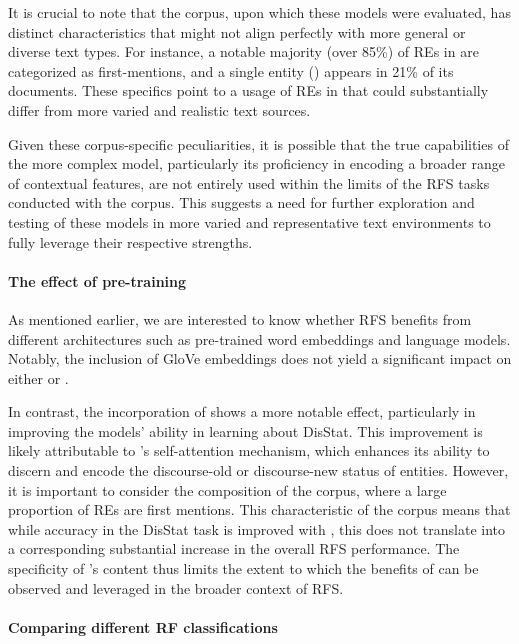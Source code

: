 It is crucial to note that the \webnlg corpus, upon which these models were evaluated, has distinct characteristics that might not align perfectly with more general or diverse text types. For instance, a notable majority (over 85\%) of REs in \webnlg are categorized as first-mentions, and a single entity () appears in 21\% of its documents. These specifics point to a usage of REs in \webnlg that could substantially differ from more varied and realistic text sources.

Given these corpus-specific peculiarities, it is possible that the true capabilities of the more complex  model, particularly its proficiency in encoding a broader range of contextual features, are not entirely used within the limits of the RFS tasks conducted with the \webnlg corpus. This suggests a need for further exploration and testing of these models in more varied and representative text environments to fully leverage their respective strengths.

\paragraph*{The effect of pre-training}

As mentioned earlier, we are interested to know whether RFS benefits from different architectures such as pre-trained word embeddings and language models. Notably, the inclusion of GloVe embeddings does not yield a significant impact on either  or . 

In contrast, the incorporation of \bert shows a more notable effect, particularly in improving the models' ability in learning about DisStat. This improvement is likely attributable to \bert's self-attention mechanism, which enhances its ability to discern and encode the discourse-old or discourse-new status of entities. However, it is important to consider the composition of the \webnlg corpus, where a large proportion of REs are first mentions. This characteristic of the corpus means that while accuracy in the DisStat task is improved with \bert, this does not translate into a corresponding substantial increase in the overall RFS performance. The specificity of \webnlg's content thus limits the extent to which the benefits of \bert can be observed and leveraged in the broader context of RFS.




\paragraph*{Comparing different RF classifications}

